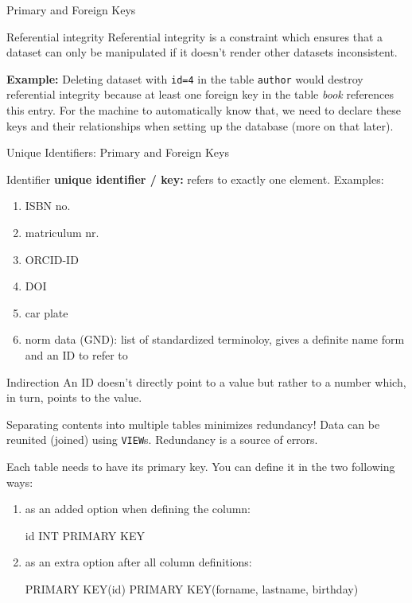 \begin{frame}[allowframebreaks]{Primary and Foreign Keys}
      \begin{exampleblock}{Referential integrity}\footnotesize
Referential integrity is a constraint which ensures that a dataset can only be manipulated if it doesn't render other datasets inconsistent. 

\textbf{Example:} Deleting dataset with \texttt{id=4} in the table \texttt{author} would destroy referential integrity because at least one foreign key in the table \emph{book} references this entry. For the machine to automatically know that, we need to declare these keys and their relationships when setting up the database (more on that later).
      \end{exampleblock}
\end{frame}
\begin{frame}{Unique Identifiers: Primary and Foreign Keys}
\begin{exampleblock}{Identifier}
\textbf{unique identifier / key:} refers to exactly one element. Examples: \vspace{-1em}
      \begin{enumerate}
          \item ISBN no.
          \item matriculum nr.
          \item ORCID-ID
          \item DOI
          \item car plate
          \item norm data (GND): list of standardized terminoloy, gives a definite name form and an ID to refer to
      \end{enumerate}
      \end{exampleblock}
      
\begin{exampleblock}{Indirection} An ID doesn't directly point to a value but rather to a number which, in turn, points to the value. 
\end{exampleblock}

\begin{exampleblock}{Separating contents into multiple tables minimizes redundancy!}  
Data can be reunited (joined) using \texttt{VIEW}s. Redundancy is a source of errors.
\end{exampleblock}
\framebreak 

Each table needs to have its primary key. You can define it in the two following ways:
\begin{enumerate}\small 
    \item as an added option when defining the column:
\begin{sqlcode}
id INT PRIMARY KEY
\end{sqlcode}
    \item as an extra option after all column definitions:
\begin{sqlcode}
PRIMARY KEY(id)
PRIMARY KEY(forname, lastname, birthday)
\end{sqlcode}
\end{enumerate}


\end{frame}

